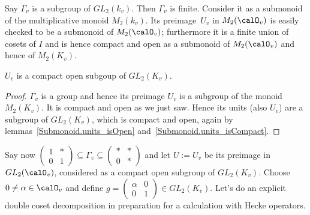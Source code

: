 Say $\Gamma_v$ is a subgroup of $GL_2(k_v)$. Then $\Gamma_v$ is finite. Consider it as a submonoid of
the multiplicative monoid $M_2(k_v)$. Its preimage~$U_v$ in $M_2(\calO_v)$
is easily checked to be a submonoid of $M_2(\calO_v)$; furthermore it is a finite union of
cosets of $I$ and is hence compact and open as a submonoid of $M_2(\calO_v)$ and hence of $M_2(K_v)$.

\begin{lemma}
  \label{nolean-compactopen-U1p} $U_v$ is a compact open subgoup of $GL_2(K_v)$.
\end{lemma}
\begin{proof}
  $\Gamma_v$ is a group and hence its preimage $U_v$ is a subgroup of the monoid
  $M_2(K_v)$. It is compact and open as we just saw. Hence its units (also $U_v$)
  are a subgroup of $GL_2(K_v)$, which is compact and open, again by
  lemmas~\ref{Submonoid.units_isOpen} and~\ref{Submonoid.units_isCompact}.
\end{proof}

Say now $\begin{pmatrix}1&*\\0&1\end{pmatrix}\subseteq\Gamma_v\subseteq\begin{pmatrix}*&*\\0&*\end{pmatrix}$
and let $U:=U_v$ be its preimage in $GL_2(\calO_v)$, considered as a compact open subgroup of $GL_2(K_v)$.
Choose $0\not=\alpha\in\calO_v$ and define $g=\begin{pmatrix}\alpha&0\\0&1\end{pmatrix}\in GL_2(K_v)$.
Let's do an explicit double coset decomposition in preparation for a calculation with Hecke operators.


